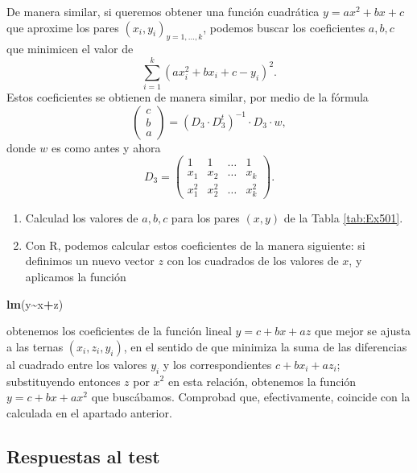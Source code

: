 \documentclass[
]{book}
\newenvironment{Shaded}{\begin{snugshade}}{\end{snugshade}}
\newcommand{\KeywordTok}[1]{\textcolor[rgb]{0.13,0.29,0.53}{\textbf{#1}}}
\newcommand{\NormalTok}[1]{#1}
\newcommand{\OperatorTok}[1]{\textcolor[rgb]{0.81,0.36,0.00}{\textbf{#1}}}
\theoremstyle{definition}
\theoremstyle{definition}
\theoremstyle{definition}
\theoremstyle{remark}
\begin{document}
De manera similar, si queremos obtener una función cuadrática \(y=a x^2+b x+c\) que aproxime los pares \((x_i, y_i)_{y=1, \ldots, k}\), podemos buscar los coeficientes \(a, b, c\) que minimicen el valor de
\[
\sum_{i=1}^k (ax_{i}^2+bx_{i}+c-y_{i})^2.
\]
Estos coeficientes se obtienen de manera similar, por medio de la fórmula
\[
\left(\begin{matrix}
c\\ b\\ a \end{matrix}
\right)=
(D_{3}\cdot D_{3}^t)^{-1}\cdot D_{3}\cdot w, 
\]
donde \(w\) es como antes y ahora
\[
D_{3}=\left(\begin{matrix}
1 & 1 & \ldots & 1 \\
x_{1} & x_{2} & \ldots & x_{k}\\[0.5ex]
x_{1}^2 & x_{2}^2 & \ldots & x_{k}^2
\end{matrix}
\right).
\]

\begin{enumerate}
\def\labelenumi{\alph{enumi}.}
\setcounter{enumi}{1}
\item
  Calculad los valores de \(a, b, c\) para los pares \((x,y)\) de la Tabla \ref{tab:Ex501}.
\item
  Con R, podemos calcular estos coeficientes de la manera siguiente: si definimos un nuevo vector \(z\) con los cuadrados de los valores de \(x\), y aplicamos la función
\end{enumerate}

\begin{Shaded}
\begin{Highlighting}[]
\KeywordTok{lm}\NormalTok{(y}\OperatorTok{\textasciitilde{}}\NormalTok{x}\OperatorTok{+}\NormalTok{z)}
\end{Highlighting}
\end{Shaded}

obtenemos los coeficientes de la función lineal \(y=c+bx+az\) que mejor se ajusta a las ternas \((x_i,z_i,y_i)\), en el sentido de que minimiza la suma de las diferencias al cuadrado entre los valores \(y_i\) y los correspondientes \(c+bx_i+az_i\); substituyendo entonces \(z\) por \(x^2\) en esta relación, obtenemos la función \(y=c+bx+ax^2\) que buscábamos. Comprobad que, efectivamente, coincide con la calculada en el apartado anterior.

\hypertarget{respuestas-al-test-2}{%
\subsection*{Respuestas al test}\label{respuestas-al-test-2}}
\end{document}
